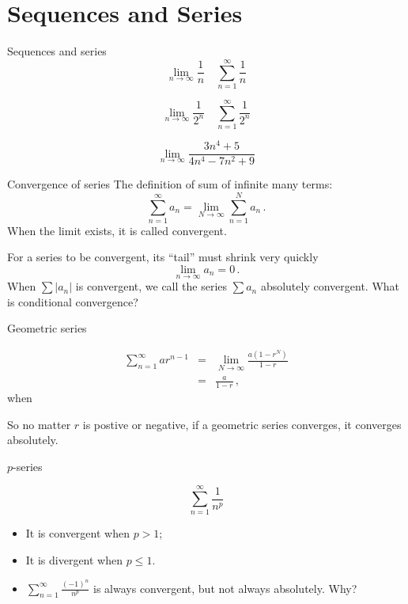 \section{Sequences and Series}
\begin{frame}{Sequences and series}
    \[
    \lim_{n\to\infty}\frac{1}{n}\quad\sum_{n=1}^{\infty}\frac{1}{n}
    \]
    \pause{}

    \[
    \lim_{n\to\infty}\frac{1}{2^{n}}\quad\sum_{n=1}^{\infty}\frac{1}{2^{n}}
    \]
    \pause{}
    
    \[
    \lim_{n\to\infty}\frac{3n^{4}+5}{4n^{4}-7n^{2}+9}
    \]
\end{frame}

\begin{frame}{Convergence of series}
    The definition of sum of infinite many terms:
    \[
    \sum_{n=1}^{\infty}a_{n}=\lim_{N\to\infty}\sum_{n=1}^{N}a_{n}\,.
    \]
    When the limit exists, it is called convergent.
    
    
    For a series to be convergent, its ``tail'' must shrink very quickly
    \[
    \lim_{n\to\infty}a_{n}=0\,.
    \]
    When $\sum\left|a_{n}\right|$ is convergent, we call the series $\sum a_{n}$
    \alert{absolutely convergent}. What is \alert{conditional convergence}?

\end{frame}

\begin{frame}{Geometric series}


\begin{eqnarray*}
\sum_{n=1}^{\infty}ar^{n-1} & = & \lim_{N\to\infty}\frac{a\left(1-r^{N}\right)}{1-r}\\
 & = & \frac{a}{1-r}\,,
\end{eqnarray*}
when 

\pause{}


So no matter $r$ is postive or negative, if a geometric series converges,
it converges absolutely.

\end{frame}

\begin{frame}{$p$-series}


\[
\sum_{n=1}^{\infty}\frac{1}{n^{p}}
\]

\begin{itemize}
\item It is convergent when $p>1$;
\item It is divergent when $p\le1$.
\item $\sum_{n=1}^{\infty}\frac{\left(-1\right)^{n}}{n^{p}}$ is always
convergent, but not always absolutely. Why?
\end{itemize}
\end{frame}

